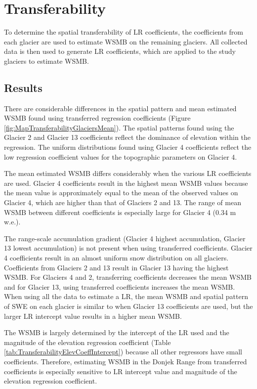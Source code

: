 \documentclass[12pt]{article}
\begin{document}
\section{Transferability}
\label{sec:transferability}

To determine the spatial transferability of LR coefficients, the coefficients from each glacier are used to estimate WSMB on the remaining glaciers. All collected data is then used to generate LR coefficients, which are applied to the study glaciers to estimate WSMB. 


\subsection{Results}

There are considerable differences in the spatial pattern and mean estimated WSMB found using transferred regression coefficients (Figure \ref{fig:MapTransferabilityGlaciersMean}). The spatial patterns found using the Glacier 2 and Glacier 13 coefficients reflect the dominance of elevation within the regression. The uniform distributions found using Glacier 4 coefficients reflect the low regression coefficient values for the topographic parameters on Glacier 4. 

The mean estimated WSMB differs considerably when the various LR coefficients are used. Glacier 4 coefficients result in the highest mean WSMB values because the mean value is approximately equal to the mean of the observed values on Glacier 4, which are higher than that of Glaciers 2 and 13. The range of mean WSMB between different coefficients is especially large for Glacier 4 (0.34 m w.e.).

The range-scale accumulation gradient (Glacier 4 highest accumulation, Glacier 13 lowest accumulation) is not present when using transferred coefficients. Glacier 4 coefficients result in an almost uniform snow distribution on all glaciers. Coefficients from Glaciers 2 and 13 result in Glacier 13 having the highest WSMB. For Glaciers 4 and 2, transferring coefficients decreases the mean WSMB and for Glacier 13, using transferred coefficients increases the mean WSMB. When using all the data to estimate a LR, the mean WSMB and spatial pattern of SWE on each glacier is similar to when Glacier 13 coefficients are used, but the larger LR intercept value results in a higher mean WSMB. 

The WSMB is largely determined by the intercept of the LR used and the magnitude of the elevation regression coefficient (Table \ref{tab:TransferabilityElevCoeffIntercept}) because all other regressors have small coefficients. Therefore, estimating WSMB in the Donjek Range from transferred coefficients is especially sensitive to LR intercept value and magnitude of the elevation regression coefficient.
\end{document}
